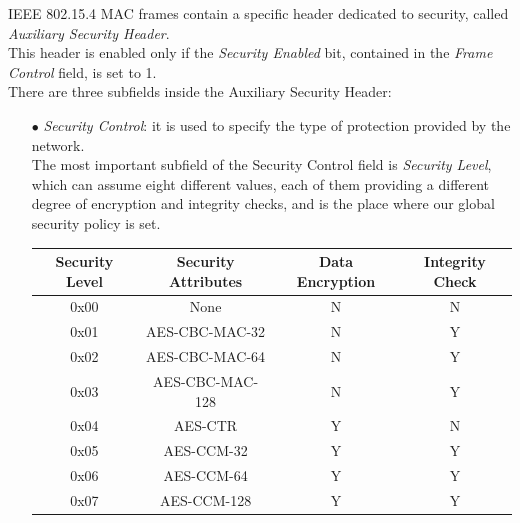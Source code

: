 \documentclass[12pt]{report}
\begin{document}
IEEE 802.15.4 MAC frames contain a specific header dedicated to security, called \emph{Auxiliary Security Header}.\\
This header is enabled only if the \emph{Security Enabled} bit, contained in the \emph{Frame Control} field, is set to 1.\\
There are three subfields inside the Auxiliary Security Header:

\begin{itemize}
\setlength{\itemindent}{+4mm}
\item[$\bullet$] \emph{Security Control}: it is used to specify the type of protection provided by the network.\\
The most important subfield of the Security Control field is \emph{Security Level}, which can assume eight different values, each of them providing a different degree of encryption and integrity checks, and is the place where our global security policy is set.

\begin{center}
\small
   \begin{tabular}{ | c | c | c | c |}
    \hline
    Security Level & Security Attributes & Data Encryption & Integrity Check \\ \hline
    0x00 & None & N & N \\ \hline
    0x01 & AES-CBC-MAC-32 & N & Y\\ \hline
    0x02 & AES-CBC-MAC-64 & N & Y \\ \hline
    0x03 & AES-CBC-MAC-128 & N & Y\\ \hline
    0x04 & AES-CTR & Y & N\\ \hline
    0x05 & AES-CCM-32 & Y & Y\\ \hline
    0x06 & AES-CCM-64 & Y & Y\\ \hline
    0x07 & AES-CCM-128 & Y &Y\\ \hline
    \end{tabular}
\end{center}

\end{itemize}
\end{document}

